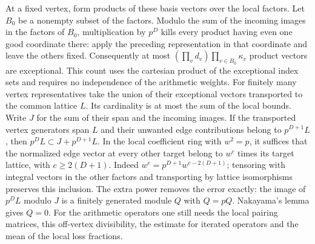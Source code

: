 \documentclass[11pt]{amsart}
\theoremstyle{definition}
\theoremstyle{remark}
\begin{document}
At a fixed vertex, form products of these basis vectors over the
local factors. Let $B_0$ be a nonempty subset of the factors. Modulo
the sum of the incoming images in the factors of $B_0$, multiplication
by $p^D$ kills every product having even one good coordinate there:
apply the preceding representation in that coordinate and leave the
others fixed. Consequently at most
$(\prod_v d_v)\prod_{v\in B_0}\kappa_v$ product vectors are
exceptional. This count uses the cartesian product of the exceptional
index sets and requires no independence of the arithmetic weights.
For finitely many vertex representatives take the union of their
exceptional vectors transported to the common lattice $L$. Its
cardinality is at most the sum of the local bounds. Write $J$ for
the sum of their span and the incoming images. If the transported
vertex generators span $L$ and their unwanted edge contributions
belong to $p^{D+1}L$, then $p^D L\subset J+p^{D+1}L$.
In the local coefficient ring with $w^2=p$, it suffices that the
normalized edge vector at every other target belong to $w^c$ times
its target lattice, with $c\ge2(D+1)$. Indeed
$w^c=p^{D+1}w^{c-2(D+1)}$; tensoring with integral vectors in
the other factors and transporting by lattice isomorphisms preserves
this inclusion. The extra
power removes the error exactly: the image of $p^D L$ modulo $J$
is a finitely generated module $Q$ with $Q=pQ$. Nakayama's lemma
gives $Q=0$. For the arithmetic operators one still needs the
local pairing matrices, this off-vertex divisibility, the estimate
for iterated operators and the mean of the local loss fractions.
\end{document}
